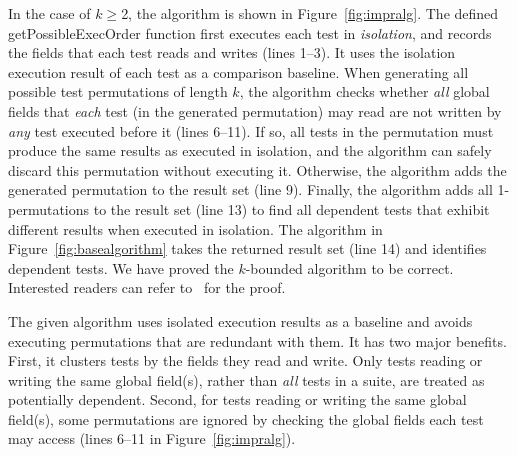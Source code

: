 In the case of $k$$\ge$2, the algorithm
is shown in Figure~\ref{fig:impralg}.
%
The defined getPossibleExecOrder function first executes
each test in \textit{isolation}, and records the
fields that each test reads and writes (lines 1--3).
It uses the isolation execution result
of each test as a comparison baseline.
When generating all possible test permutations
of length $k$, the algorithm checks whether
\textit{all} global fields that \textit{each} test (in the generated permutation)
may read are not written by \textit{any} test executed before it (lines 6--11).
If so, all tests in the permutation
must produce the same results as executed in isolation,
and the algorithm can safely discard this permutation without
executing it. Otherwise, the algorithm adds the generated
permutation to the result set (line 9).
Finally, the algorithm adds all 1-permutations to
the result set (line 13)
to find all dependent tests that exhibit different results
when executed in isolation.
The algorithm in Figure~\ref{fig:basealgorithm} takes the
returned result set (line 14) and identifies dependent tests. %
%
We have proved the \dependenceaware{} $k$-bounded algorithm to be
correct. Interested
readers can refer to~\cite{testdependence} for the proof.

The given algorithm uses isolated execution results as a baseline and
avoids executing permutations that are redundant with them.
%
It has two major benefits.
First, it clusters tests by the fields they
read and write. Only tests reading or writing
the same global field(s), rather than \textit{all} tests
in a suite, are treated as potentially dependent.
Second, for tests reading or writing the same global
field(s), some permutations are ignored by checking
the global fields each test may access (lines 6--11 in
Figure~\ref{fig:impralg}). 



